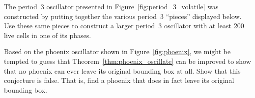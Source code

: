 \begin{multicols}{2}
	
	\mfilbreak
	
	
	\begin{problemstar}\label{exer:period_3_volatile} 
		The period~3 oscillator presented in Figure~\ref{fig:period_3_volatile} was constructed by putting together the various period~3 ``pieces'' displayed below. Use these same pieces to construct a larger period~3 oscillator with at least 200 live cells in one of its phases.
		\begin{center}
		\end{center}
	\end{problemstar}
	
	
	\mfilbreak
	
	
	\begin{problemstar}\label{exer:phoenix_bb} 
		Based on the phoenix oscillator shown in Figure~\ref{fig:phoenix}, we might be tempted to guess that Theorem~\ref{thm:phoenix_oscillate} can be improved to show that no phoenix can ever leave its original bounding box at all. Show that this conjecture is false. That is, find a phoenix that does in fact leave its original bounding box.
	\end{problemstar}
	
\end{multicols}
\normalsize\vspace*{0.01cm}
